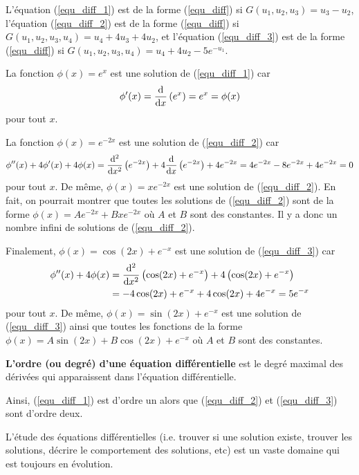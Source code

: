{\begin{egg}
L'équation (\ref{equ_diff_1}) est de la forme (\ref{equ_diff}) si
$G(u_1,u_2,u_3) = u_3 - u_2$,  l'équation (\ref{equ_diff_2}) est de la
forme (\ref{equ_diff}) si $G(u_1,u_2,u_3,u_4) = u_4 +4u_3 +4u_2$, et
l'équation (\ref{equ_diff_3}) est de la forme (\ref{equ_diff}) si
$G(u_1,u_2,u_3,u_4) = u_4 +4u_2 - 5e^{-u_1}$.

La fonction $\phi(x) = e^x$ est une solution de (\ref{equ_diff_1}) car
\[
\phi'(x) = \dfdx{\left(e^x\right)}{x} = e^x = \phi(x)
\]
pour tout $x$.

La fonction $\phi(x) = e^{-2x}$ est une solution de (\ref{equ_diff_2})
car
\[
\phi''(x) + 4 \phi'(x) + 4 \phi(x)
=\dfdxn{\left( e^{-2x}\right)}{x}{2}
+ 4 \dfdx{\left(e^{-2x}\right)}{x} + 4 e^{-2x}
= 4 e^{-2x} -8 e^{-2x} + 4 e^{-2x} = 0
\]
pour tout $x$.  De même, $\phi(x) = xe^{-2x}$ est une solution de
(\ref{equ_diff_2}).  En fait, on pourrait montrer que toutes les
solutions de (\ref{equ_diff_2}) sont de la forme
$\phi(x) = A e^{-2x} + Bx e^{-2x}$ où $A$ et $B$ sont des
constantes.  Il y a donc un nombre infini de solutions de
(\ref{equ_diff_2}).

Finalement, $\phi(x)=\cos(2x) + e^{-x}$ est une solution de
(\ref{equ_diff_3}) car
\begin{align*}
\phi''(x) + 4 \phi(x)
&= \dfdxn{\left(\cos(2x)+e^{-x}\right)}{x}{2}
+ 4 \left(\cos(2x)+e^{-x}\right) \\
&= -4\cos(2x) + e^{-x} + 4\cos(2x) + 4 e^{-x} = 5 e^{-x}
\end{align*}
pour tout $x$.  De même, $\phi(x)=\sin(2x) + e^{-x}$ est une solution de
(\ref{equ_diff_3}) ainsi que toutes les fonctions de
la forme $\phi(x) = A \sin(2x) + B\cos(2x) + e^{-x}$ où $A$ et $B$
sont des constantes.
\end{egg}

\begin{defn} 
{\bfseries L'ordre (ou degré) d'une équation différentielle} est le
degré maximal des dérivées qui apparaissent dans l'équation
différentielle.
\end{defn}

Ainsi, (\ref{equ_diff_1}) est d'ordre un alors que (\ref{equ_diff_2})
et (\ref{equ_diff_3}) sont d'ordre deux.

L'étude des équations différentielles (i.e. trouver si une solution
existe, trouver les solutions, décrire le comportement des solutions,
etc) est un vaste domaine qui est toujours en évolution.

}
